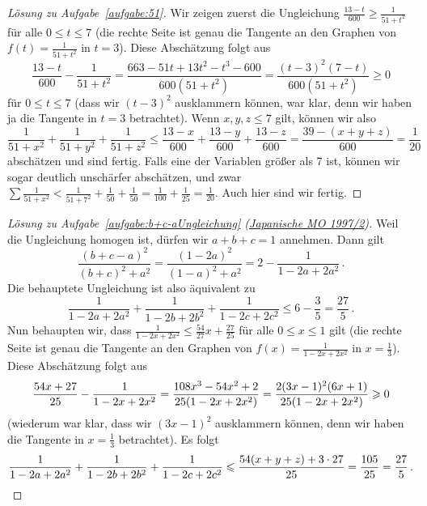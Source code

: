 \begin{proof}[Lösung zu Aufgabe~\ref{aufgabe:51}]
	Wir zeigen zuerst die Ungleichung $\frac{13-t}{600}\geqslant\frac1{51+t^2}$ für alle $0\leqslant t\leqslant7$ (die rechte Seite ist genau die Tangente an den Graphen von $f(t)=\frac{1}{51+t^2}$ in $t=3$). Diese Abschätzung folgt aus
	\begin{equation*}
		\frac{13-t}{600}-\frac1{51+t^2}=\frac{663-51t+13t^2-t^3-600}{600(51+t^2)}=\frac{(t-3)^2(7-t)}{600(51+t^2)}\geqslant0
	\end{equation*}für $0\leqslant t\leqslant7$ (dass wir $(t-3)^2$ ausklammern können, war klar, denn wir haben ja die Tangente in $t=3$ betrachtet). Wenn $x,y,z\leqslant7$ gilt, können wir also
	\begin{equation*}
		\frac1{51+x^2}+\frac1{51+y^2}+\frac1{51+z^2}\leqslant\frac{13-x}{600}+\frac{13-y}{600}+\frac{13-z}{600}=\frac{39-(x+y+z)}{600}=\frac1{20}
	\end{equation*}
	abschätzen und sind fertig. Falls eine der Variablen größer als 7 ist, können wir sogar deutlich unschärfer abschätzen, und zwar $\sum\frac1{51+x^2}<\frac1{51+7^2}+\frac1{50}+\frac1{50}= \frac1{100}+\frac1{25}=\frac1{20}$. Auch hier sind wir fertig.
\end{proof}
\begin{proof}[Lösung zu Aufgabe~\ref{aufgabe:b+c-aUngleichung} \textmd{(\href{https://artofproblemsolving.com/community/c5082_1997_japan_mo_finals}{Japanische MO 1997/2})}]
	Weil die Ungleichung homogen ist, dürfen wir $a+b+c=1$ annehmen. Dann gilt
	\begin{equation*}
		\frac{(b+c-a)^2}{(b+c)^2+a^2}=\frac{(1-2a)^2}{(1-a)^2+a^2}=2-\frac{1}{1-2a+2a^2}\,.
	\end{equation*}
	Die behauptete Ungleichung ist also äquivalent zu
	\begin{equation*}
		\frac{1}{1-2a+2a^2}+\frac{1}{1-2b+2b^2}+\frac{1}{1-2c+2c^2}\leqslant 6-\frac35=\frac{27}{5}\,.
	\end{equation*}
	Nun behaupten wir, dass $\frac{1}{1-2x+2x^2}\leqslant \frac{54}{27}x+\frac{27}{25}$ für alle $0\leqslant x\leqslant 1$ gilt (die rechte Seite ist genau die Tangente an den Graphen von $f(x)=\frac{1}{1-2x+2x^2}$ in $x=\frac13$). Diese Abschätzung folgt aus
	\begin{equation*}
		\frac{54x+27}{25}-\frac{1}{1-2x+2x^2}=\frac{108x^3-54x^2+2}{25\parens*{1-2x+2x^2}}=\frac{2(3x-1)^2(6x+1)}{25(1-2x+2x^2)}\geqslant 0
	\end{equation*}
	(wiederum war klar, dass wir $(3x-1)^2$ ausklammern können, denn wir haben die Tangente in $x=\frac13$ betrachtet). Es folgt
	\begin{equation*}
		\frac{1}{1-2a+2a^2}+\frac{1}{1-2b+2b^2}+\frac{1}{1-2c+2c^2}\leqslant \frac{54(x+y+z)+3\cdot 27}{25}=\frac{105}{25}=\frac{27}{5}\,.\qedhere
	\end{equation*}
\end{proof}
